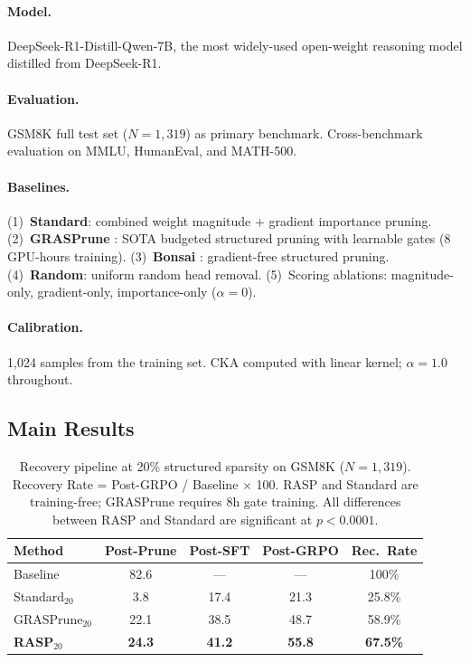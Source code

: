 \documentclass[11pt,a4paper]{article}
\begin{document}
\paragraph{Model.} DeepSeek-R1-Distill-Qwen-7B, the most widely-used open-weight reasoning model distilled from DeepSeek-R1.

\paragraph{Evaluation.} GSM8K \cite{gsm8k2021} full test set ($N = 1{,}319$) as primary benchmark. Cross-benchmark evaluation on MMLU, HumanEval, and MATH-500.

\paragraph{Baselines.} (1)~\textbf{Standard}: combined weight magnitude + gradient importance pruning. (2)~\textbf{GRASPrune} \cite{graspune2026}: SOTA budgeted structured pruning with learnable gates (8 GPU-hours training). (3)~\textbf{Bonsai} \cite{bonsai2025}: gradient-free structured pruning. (4)~\textbf{Random}: uniform random head removal. (5)~Scoring ablations: magnitude-only, gradient-only, importance-only ($\alpha=0$).

\paragraph{Calibration.} 1{,}024 samples from the training set. CKA computed with linear kernel; $\alpha = 1.0$ throughout.

\subsection{Main Results}

\begin{table}[t]
\centering
\small
\begin{tabular}{@{}lcccc@{}}
\toprule
\textbf{Method} & \textbf{Post-Prune} & \textbf{Post-SFT} & \textbf{Post-GRPO} & \textbf{Rec.\ Rate} \\
\midrule
Baseline & 82.6 & --- & --- & 100\% \\
\midrule
Standard$_{20}$ & 3.8 & 17.4 & 21.3 & 25.8\% \\
GRASPrune$_{20}$ & 22.1 & 38.5 & 48.7 & 58.9\% \\
\textbf{RASP}$_{20}$ & \textbf{24.3} & \textbf{41.2} & \textbf{55.8} & \textbf{67.5\%} \\
\bottomrule
\end{tabular}
\caption{Recovery pipeline at 20\% structured sparsity on GSM8K ($N=1{,}319$). Recovery Rate = Post-GRPO / Baseline $\times$ 100. RASP and Standard are training-free; GRASPrune requires 8h gate training. All differences between RASP and Standard are significant at $p < 0.0001$.}
\label{tab:main}
\end{table}
\end{document}
